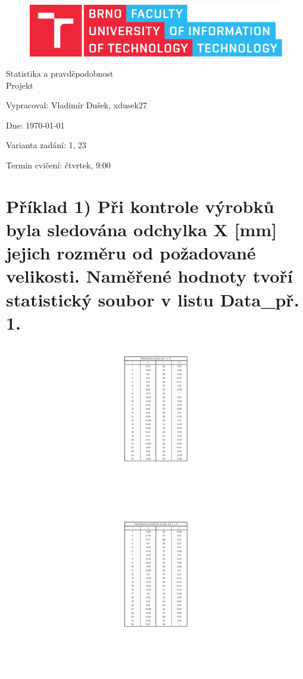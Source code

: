 \documentclass[11pt, a4paper, titlepage]{article}
\begin{document}
\begin{titlepage}
    \begin{center}
        \begin{figure}[htb]
            \centering
            \includegraphics[width=0.85\hsize]{images/fitlogo.pdf}
        \end{figure}
        {\Huge Statistika a pravděpodobnost} \\
        \bigskip
        {\LARGE Projekt} \\
    \end{center}

    {\Large Vypracoval: Vladimír Dušek, xdusek27}
    \medskip

    {\Large Dne: \today}
    \medskip

    {\Large Varianta zadání: 1, 23}
    \medskip

    {\Large Termín cvičení: čtvrtek, 9:00}

\end{titlepage}





\section*{Příklad 1) Při kontrole výrobků byla sledována odchylka X [mm] jejich rozměru od požadované velikosti. Naměřené hodnoty tvoří statistický soubor v listu Data\_př. 1.}

\begin{figure}[H]
    \centering
    \includegraphics[width=.49\linewidth]{images/1-1-crop.pdf}
    \hfill
    \includegraphics[width=.49\linewidth]{images/1-2-crop.pdf}
\end{figure}
\end{document}
